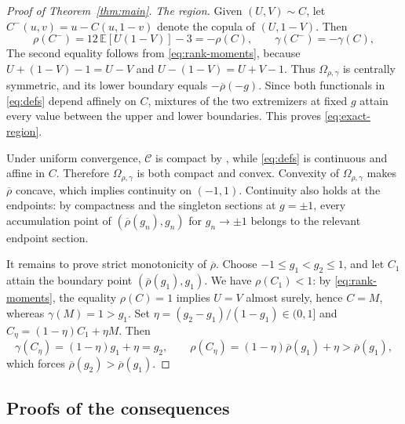 \documentclass{article}
\theoremstyle{definition}
\theoremstyle{remark}
\newcommand{\1}{\mathds{1}}
\newcommand{\E}{\mathbb{E}}
\newcommand{\CC}{\mathcal{C}}
\newcommand{\Om}{\Omega_{\rho,\gamma}}
\newcommand{\rhoup}{\overline{\rho}}
\begin{document}
\begin{proof}[Proof of Theorem~\ref{thm:main}]
	\emph{The region.}
	Given $(U,V)\sim C$, let $C^-(u,v)=u-C(u,1-v)$ denote the copula of $(U,1-V)$. Then
	\[
		\rho(C^-)=12\,\E[U(1-V)]-3=-\rho(C),\qquad\gamma(C^-)=-\gamma(C),
	\]
	The second equality follows from \eqref{eq:rank-moments}, because $U+(1-V)-1=U-V$ and $U-(1-V)=U+V-1$.
	Thus $\Om$ is centrally symmetric, and its lower boundary equals $-\rhoup(-g)$.
	Since both functionals in \eqref{eq:defs} depend affinely on $C$, mixtures of the two extremizers at fixed $g$ attain every value between the upper and lower boundaries.
	This proves \eqref{eq:exact-region}.

	Under uniform convergence, $\CC$ is compact by \citet[Sec.~1.7]{durante2015principles}, while \eqref{eq:defs} is continuous and affine in $C$. Therefore $\Om$ is both compact and convex.
	Convexity of $\Om$ makes $\rhoup$ concave, which implies continuity on $(-1,1)$.
	Continuity also holds at the endpoints: by compactness and the singleton sections at $g=\pm1$, every accumulation point of $(\rhoup(g_n),g_n)$ for $g_n\to\pm1$ belongs to the relevant endpoint section.

	It remains to prove strict monotonicity of $\rhoup$.
	Choose $-1\le g_1<g_2\le1$, and let $C_1$ attain the boundary point $(\rhoup(g_1),g_1)$.
	We have $\rho(C_1)<1$: by \eqref{eq:rank-moments}, the equality $\rho(C)=1$ implies $U=V$ almost surely, hence $C=M$, whereas $\gamma(M)=1>g_1$.
	Set $\eta=(g_2-g_1)/(1-g_1)\in(0,1]$ and $C_\eta=(1-\eta)C_1+\eta M$. Then
	\[
		\gamma(C_\eta)=(1-\eta)g_1+\eta=g_2,\qquad
		\rho(C_\eta)=(1-\eta)\rhoup(g_1)+\eta>\rhoup(g_1),
	\]
	which forces $\rhoup(g_2)>\rhoup(g_1)$.
\end{proof}

\subsection{Proofs of the consequences}\label{sec:consequence-proofs}
\end{document}
